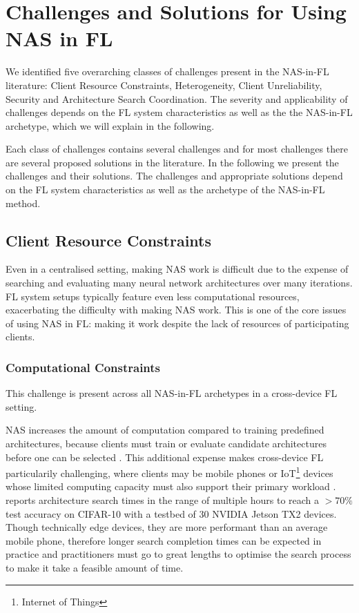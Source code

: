\chapter{Challenges and Solutions for Using NAS in FL}\label{chapter:nas_in_fl_ch_and_sol}

We identified five overarching classes of challenges present in the NAS-in-FL literature: Client Resource Constraints, Heterogeneity, Client Unreliability, Security and Architecture Search Coordination. The severity and applicability of challenges depends on the FL system characteristics as well as the the NAS-in-FL archetype, which we will explain in the following. 

Each class of challenges contains several challenges and for most challenges there are several proposed solutions in the literature. In the following we present the challenges and their solutions. The challenges and appropriate solutions depend on the FL system characteristics as well as the archetype of the NAS-in-FL method. 


\section{Client Resource Constraints}

Even in a centralised setting, making NAS work is difficult due to the expense of searching and evaluating many neural network architectures over many iterations. %
FL system setups typically feature even less computational resources, exacerbating the difficulty with making NAS work. This is one of the core issues of using NAS in FL: making it work despite the lack of resources of participating clients.

\subsection{Computational Constraints}

This challenge is present across all NAS-in-FL archetypes in a cross-device FL setting.

NAS increases the amount of computation compared to training predefined architectures, because clients must train or evaluate candidate architectures before one can be selected \cite{peaches_2024,dfnas_2020}. This additional expense makes cross-device FL particularily challenging, where clients may be mobile phones or IoT\footnote{Internet of Things} devices whose limited computing capacity must also support their primary workload \cite{fednas_over_hetero_mobile_devices_2022,dfnas_2020}. \cite{peaches_2024} reports architecture search times in the range of multiple hours to reach a $>70\%$ test accuracy on CIFAR-10 with a testbed of 30 NVIDIA Jetson TX2 devices. Though technically edge devices, they are more performant than an average mobile phone, therefore longer search completion times can be expected in practice and practitioners must go to great lengths to optimise the search process to make it take a feasible amount of time. 

